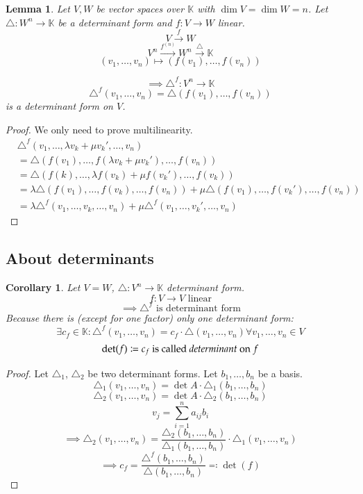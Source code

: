 \documentclass{article}
\newcounter{lecref}[section]
\numberwithin{lecref}{section}
\newtheorem{lemma}[lecref]{Lemma}
\newtheorem{corollary}[lecref]{Corollary}
\begin{document}
\begin{lemma} %
  Let $V, W$ be vector spaces over $\mathbb K$ with $\dim{V} = \dim{W} = n$.
  Let $\triangle: W^n \to \mathbb K$ be a determinant form and $f: V \to W$ linear.
  \[ V \xrightarrow{f} W \]
  \[ V^n \xrightarrow{f^{(n)}} W^n \xrightarrow{\triangle} \mathbb K \]
  \[ (v_1, \dots, v_n) \mapsto (f(v_1), \dots, f(v_n)) \]

  \[ \implies \triangle^f: V^n \to \mathbb K \]
  \[ \triangle^f(v_1, \dots, v_n) = \triangle(f(v_1), \dots, f(v_n)) \]
  is a determinant form on $V$.
\end{lemma}

\begin{proof}
  We only need to prove multilinearity.
  \begin{align*}
    &\triangle^f (v_1, \dots, \lambda v_k + \mu v_k', \dots, v_n) \\
    &= \triangle (f(v_1), \dots, f(\lambda v_k + \mu v_k'), \dots, f(v_n)) \\
    &= \triangle(f(k), \dots, \lambda f(v_k) + \mu f(v_k'), \dots, f(v_k)) \\
    &= \lambda \triangle (f(v_1), \dots, f(v_k), \dots, f(v_n)) + \mu \triangle(f(v_1), \dots, f(v_k'), \dots, f(v_n)) \\
    &= \lambda \triangle^f(v_1, \dots, v_k, \dots, v_n) + \mu \triangle^f (v_1, \dots, v_k', \dots, v_n)
  \end{align*}
\end{proof}

\subsection{About determinants}

\begin{corollary} %
  \label{cor726}
  Let $V = W$, $\triangle: V^n \to \mathbb K$ determinant form.
  \[ f: V \to V \text{ linear} \]
  \[ \implies \triangle^f \text{ is determinant form} \]
  Because there is (except for one factor) only one determinant form:
  \[ \exists c_f \in \mathbb K: \triangle^f(v_1, \dots, v_n) = c_f \cdot \triangle(v_1, \dots, v_n) \forall v_1,\dots,v_n \in V \]
  \[ \det(f) \coloneqq c_f \text{ is called \emph{determinant} on } f \]
\end{corollary}

\begin{proof}
  Let $\triangle_1$, $\triangle_2$ be two determinant forms. Let $b_1, \dots, b_n$ be a basis.
  \[ \triangle_1 (v_1, \dots, v_n) = \det{A} \cdot \triangle_1(b_1, \dots, b_n) \]
  \[ \triangle_2 (v_1, \dots, v_n) = \det{A} \cdot \triangle_2(b_1, \dots, b_n) \]
  \[ v_j = \sum_{i=1}^n a_{ij} b_i \]
  \[ \implies \triangle_2(v_1, \dots, v_n) = \frac{\triangle_2(b_1, \dots, b_n)}{\triangle_1(b_1, \dots, b_n)} \cdot \triangle_1(v_1, \dots, v_n) \]
  \[ \implies c_f = \frac{\triangle^f(b_1, \dots, b_n)}{\triangle (b_1, \dots, b_n)} \eqqcolon \det(f) \]
\end{proof}
\end{document}
